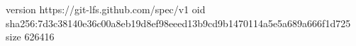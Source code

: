 version https://git-lfs.github.com/spec/v1
oid sha256:7d3c38140e36c00a8eb19d8ef98eeed13b9cd9b1470114a5e5a689a666f1d725
size 626416
